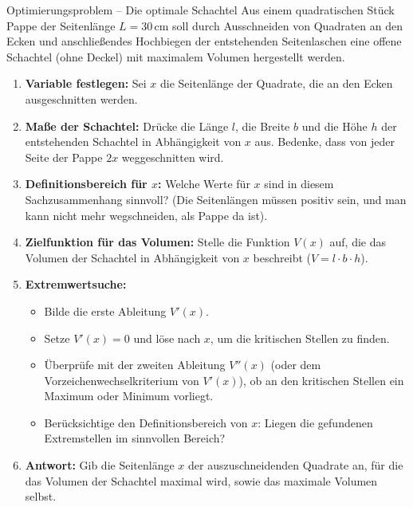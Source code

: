 \begin{aufgabenumgebung}{Optimierungsproblem – Die optimale Schachtel}
Aus einem quadratischen Stück Pappe der Seitenlänge $L=30\,$cm soll durch Ausschneiden von Quadraten an den Ecken und anschließendes Hochbiegen der entstehenden Seitenlaschen eine offene Schachtel (ohne Deckel) mit maximalem Volumen hergestellt werden.


\begin{enumerate}
    \item \textbf{Variable festlegen:} Sei $x$ die Seitenlänge der Quadrate, die an den Ecken ausgeschnitten werden.
    \item \textbf{Maße der Schachtel:} Drücke die Länge $l$, die Breite $b$ und die Höhe $h$ der entstehenden Schachtel in Abhängigkeit von $x$ aus. Bedenke, dass von jeder Seite der Pappe $2x$ weggeschnitten wird.
    \item \textbf{Definitionsbereich für $x$:} Welche Werte für $x$ sind in diesem Sachzusammenhang sinnvoll? (Die Seitenlängen müssen positiv sein, und man kann nicht mehr wegschneiden, als Pappe da ist).
    \item \textbf{Zielfunktion für das Volumen:} Stelle die Funktion $V(x)$ auf, die das Volumen der Schachtel in Abhängigkeit von $x$ beschreibt ($V = l \cdot b \cdot h$).
    \item \textbf{Extremwertsuche:}
        \begin{itemize}
            \item Bilde die erste Ableitung $V'(x)$.
            \item Setze $V'(x)=0$ und löse nach $x$, um die kritischen Stellen zu finden.
            \item Überprüfe mit der zweiten Ableitung $V''(x)$ (oder dem Vorzeichenwechselkriterium von $V'(x)$), ob an den kritischen Stellen ein Maximum oder Minimum vorliegt.
            \item Berücksichtige den Definitionsbereich von $x$: Liegen die gefundenen Extremstellen im sinnvollen Bereich?
        \end{itemize}
    \item \textbf{Antwort:} Gib die Seitenlänge $x$ der auszuschneidenden Quadrate an, für die das Volumen der Schachtel maximal wird, sowie das maximale Volumen selbst.
\end{enumerate}
\end{aufgabenumgebung}

